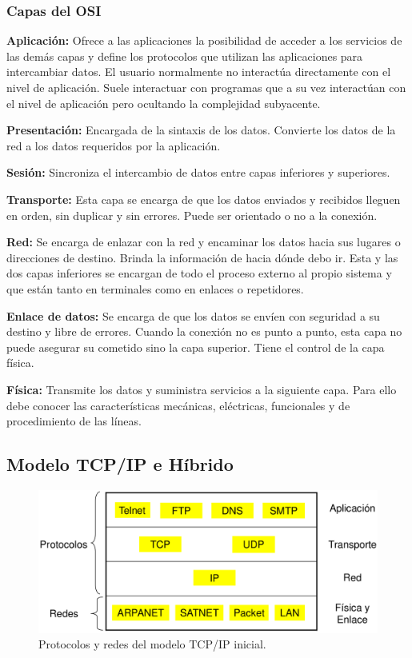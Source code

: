 \documentclass[10pt,a4paper]{article}
\begin{document}
\subsubsection{Capas del OSI}
\begin{description}
\item \textbf{Aplicación:} Ofrece a las aplicaciones la posibilidad de acceder a los servicios de las demás capas y define los protocolos que utilizan las aplicaciones para intercambiar datos. El usuario normalmente no interactúa directamente con el nivel de aplicación. Suele interactuar con programas que a su vez interactúan con el nivel de aplicación pero ocultando la complejidad subyacente.
\item \textbf{Presentación:} Encargada de la sintaxis de los datos. Convierte los datos de la red a los datos requeridos por la aplicación.
\item \textbf{Sesión:} Sincroniza el intercambio de datos entre capas inferiores y superiores.
\item \textbf{Transporte:} Esta capa se encarga de que los datos enviados y recibidos lleguen en orden, sin duplicar y sin errores. Puede ser orientado o no a la conexión.
\item \textbf{Red:} Se encarga de enlazar con la red y encaminar los datos hacia sus lugares o direcciones de destino. Brinda la información de hacia dónde debo ir. Esta y las dos capas inferiores se encargan de todo el proceso externo al propio sistema y que están tanto en terminales como en enlaces o repetidores.
\item \textbf{Enlace de datos:} Se encarga de que los datos se envíen con seguridad a su destino y libre de errores. Cuando la conexión no es punto a punto, esta capa no puede asegurar su cometido sino la capa superior. Tiene el control de la capa física.
\item \textbf{Física:} Transmite los datos y suministra servicios a la siguiente capa. Para ello debe conocer las características mecánicas, eléctricas, funcionales y de procedimiento de las líneas.
\end{description}

\subsection{Modelo TCP/IP e Híbrido}

\begin{figure}
  \caption{Protocolos y redes del modelo TCP/IP inicial.}
  \label{fig:tcp_ip}  
  \centering
  \hbox{\includegraphics[width=0.45\textwidth-\fboxrule-\fboxrule]{imgs/tcp_ip.png}}  
\end{figure}
\end{document}
